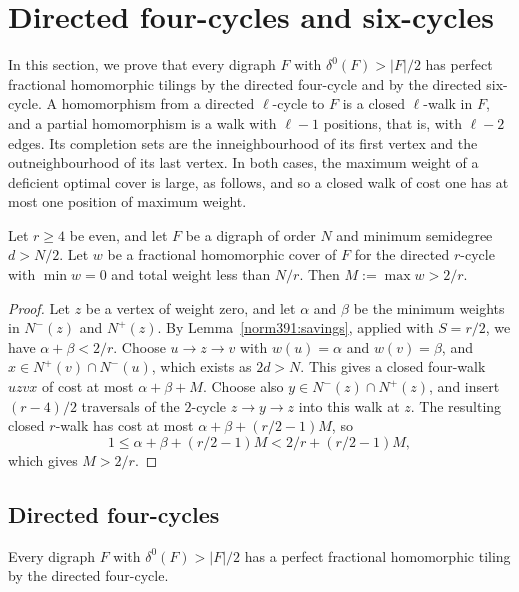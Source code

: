 \section{Directed four-cycles and six-cycles}\label{sec:directed}
In this section, we prove that every digraph $F$ with $\delta^0(F)>|F|/2$ has perfect fractional homomorphic tilings by the directed four-cycle and by the directed six-cycle. A homomorphism from a directed $\ell$-cycle to $F$ is a closed $\ell$-walk in $F$, and a partial homomorphism is a walk with $\ell-1$ positions, that is, with $\ell-2$ edges. Its completion sets are the inneighbourhood of its first vertex and the outneighbourhood of its last vertex.
In both cases, the maximum weight of a deficient optimal cover is large, as follows, and so a closed walk of cost one has at most one position of maximum weight.

\begin{lemma}
\label{c4:lem:boundary}\label{c6:lem:maxthird}
Let $r\ge4$ be even, and let $F$ be a digraph of order $N$ and minimum
semidegree $d>N/2$. Let $w$ be a fractional homomorphic cover of $F$ for the directed
$r$-cycle with $\min w=0$ and total weight less than $N/r$. Then
$M:=\max w>2/r$.
\end{lemma}
\begin{proof}
Let $z$ be a vertex of weight zero, and let $\alpha$ and $\beta$ be the minimum weights in $N^-(z)$ and $N^+(z)$. By Lemma~\ref{norm391:savings}, applied with $S=r/2$, we have $\alpha+\beta<2/r$.
Choose $u\to z\to v$ with $w(u)=\alpha$ and $w(v)=\beta$, and
$x\in N^+(v)\cap N^-(u)$, which exists as $2d>N$. This gives a closed four-walk $uzvx$ of cost
at most $\alpha+\beta+M$.
Choose also $y\in N^-(z)\cap N^+(z)$, and insert $(r-4)/2$ traversals of the $2$-cycle
$z\to y\to z$ into this walk at $z$. The resulting closed
$r$-walk has cost at most $\alpha+\beta+(r/2-1)M$, so
\[
 1\le\alpha+\beta+(r/2-1)M<2/r+(r/2-1)M,
\]
which gives $M>2/r$.
\end{proof}

\subsection{Directed four-cycles}
\label{c4:section}\label{compact390:directed-four}

\begin{theorem}\label{c4:thm:fractional}
Every digraph $F$ with $\delta^0(F)>|F|/2$ has a perfect fractional homomorphic tiling by the directed four-cycle.
\end{theorem}

